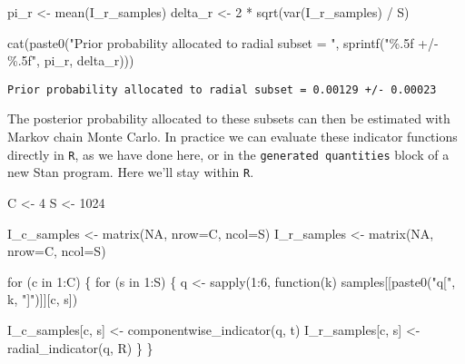 \documentclass[
  letterpaper,
  DIV=11,
  numbers=noendperiod]{scrartcl}
\newenvironment{Shaded}{\begin{snugshade}}{\end{snugshade}}
\newcommand{\AttributeTok}[1]{\textcolor[rgb]{0.40,0.45,0.13}{#1}}
\newcommand{\ConstantTok}[1]{\textcolor[rgb]{0.56,0.35,0.01}{#1}}
\newcommand{\ControlFlowTok}[1]{\textcolor[rgb]{0.00,0.23,0.31}{#1}}
\newcommand{\DecValTok}[1]{\textcolor[rgb]{0.68,0.00,0.00}{#1}}
\newcommand{\FunctionTok}[1]{\textcolor[rgb]{0.28,0.35,0.67}{#1}}
\newcommand{\NormalTok}[1]{\textcolor[rgb]{0.00,0.23,0.31}{#1}}
\newcommand{\OtherTok}[1]{\textcolor[rgb]{0.00,0.23,0.31}{#1}}
\newcommand{\SpecialCharTok}[1]{\textcolor[rgb]{0.37,0.37,0.37}{#1}}
\newcommand{\StringTok}[1]{\textcolor[rgb]{0.13,0.47,0.30}{#1}}
\begin{document}
\begin{Shaded}
\begin{Highlighting}[]
\NormalTok{pi\_r }\OtherTok{\textless{}{-}} \FunctionTok{mean}\NormalTok{(I\_r\_samples)}
\NormalTok{delta\_r }\OtherTok{\textless{}{-}} \DecValTok{2} \SpecialCharTok{*} \FunctionTok{sqrt}\NormalTok{(}\FunctionTok{var}\NormalTok{(I\_r\_samples) }\SpecialCharTok{/}\NormalTok{ S)}

\FunctionTok{cat}\NormalTok{(}\FunctionTok{paste0}\NormalTok{(}\StringTok{"Prior probability allocated to radial subset = "}\NormalTok{,}
           \FunctionTok{sprintf}\NormalTok{(}\StringTok{"\%.5f +/{-} \%.5f"}\NormalTok{, pi\_r, delta\_r)))}
\end{Highlighting}
\end{Shaded}

\begin{verbatim}
Prior probability allocated to radial subset = 0.00129 +/- 0.00023
\end{verbatim}

The posterior probability allocated to these subsets can then be
estimated with Markov chain Monte Carlo. In practice we can evaluate
these indicator functions directly in \texttt{R}, as we have done here,
or in the \texttt{generated\ quantities} block of a new Stan program.
Here we'll stay within \texttt{R}.

\begin{Shaded}
\begin{Highlighting}[]
\NormalTok{C }\OtherTok{\textless{}{-}} \DecValTok{4}
\NormalTok{S }\OtherTok{\textless{}{-}} \DecValTok{1024}

\NormalTok{I\_c\_samples }\OtherTok{\textless{}{-}} \FunctionTok{matrix}\NormalTok{(}\ConstantTok{NA}\NormalTok{, }\AttributeTok{nrow=}\NormalTok{C, }\AttributeTok{ncol=}\NormalTok{S)}
\NormalTok{I\_r\_samples }\OtherTok{\textless{}{-}} \FunctionTok{matrix}\NormalTok{(}\ConstantTok{NA}\NormalTok{, }\AttributeTok{nrow=}\NormalTok{C, }\AttributeTok{ncol=}\NormalTok{S)}

\ControlFlowTok{for}\NormalTok{ (c }\ControlFlowTok{in} \DecValTok{1}\SpecialCharTok{:}\NormalTok{C) \{}
  \ControlFlowTok{for}\NormalTok{ (s }\ControlFlowTok{in} \DecValTok{1}\SpecialCharTok{:}\NormalTok{S) \{}
\NormalTok{    q }\OtherTok{\textless{}{-}} \FunctionTok{sapply}\NormalTok{(}\DecValTok{1}\SpecialCharTok{:}\DecValTok{6}\NormalTok{, }\ControlFlowTok{function}\NormalTok{(k)}
\NormalTok{                     samples[[}\FunctionTok{paste0}\NormalTok{(}\StringTok{"q["}\NormalTok{, k, }\StringTok{"]"}\NormalTok{)]][c, s])}

\NormalTok{    I\_c\_samples[c, s] }\OtherTok{\textless{}{-}} \FunctionTok{componentwise\_indicator}\NormalTok{(q, t)}
\NormalTok{    I\_r\_samples[c, s] }\OtherTok{\textless{}{-}} \FunctionTok{radial\_indicator}\NormalTok{(q, R)}
\NormalTok{  \}}
\NormalTok{\}}
\end{Highlighting}
\end{Shaded}
\end{document}
